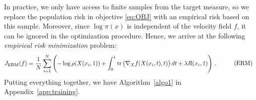 







In practice, we only have access to  finite samples
from the target measure, so we replace the population risk in
objective \eqref{eq:OBJ} with an empirical risk based on this
sample. Moreover, since $\log \pi(x)$ is independent of the velocity field $f$, it can be ignored in the optimization procedure. Hence, we arrive at the following \textit{empirical risk minimization} problem:
\begin{equation}\label{ERM}
  \begin{aligned}
    J_\text{ERM}(f) 
    &= \frac{1}{N}\sum_{i=1}^N\left( -\log\rho(X(x_i,1)) +
      \int_0^1 {\mathrm{tr}} \left ( \nabla_X f(X(x_i,t),t) \right )dt + \lambda R(x_i,1)\right) \, .
  \end{aligned}\tag{ERM}
\end{equation}
Putting everything together, we have Algorithm~\ref{algo1} in Appendix~\ref{app:training}. 



